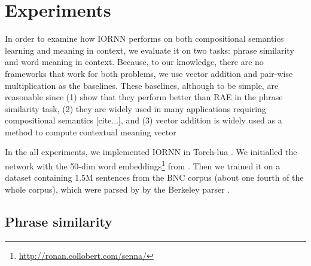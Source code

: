 \documentclass[11pt]{article}
\begin{document}

\section{Experiments}
\label{section experiments}

In order to examine how IORNN performs on both compositional semantics learning and 
meaning in context, we evaluate it on two tasks: phrase similarity and 
word meaning in context. Because, to our knowledge, there are no frameworks 
that work for both problems, we use vector addition and pair-wise multiplication 
as the baselines. These baselines, although to be simple, are reasonable since 
(1) \cite{blacoe_comparison_2012} show that they perform better than RAE in the 
phrase similarity task, (2) they are widely used in many applications requiring 
compositional semantics [cite...], and (3) vector addition is widely used as a method 
to compute contextual meaning vector \cite{thater2011word}

In the all experiments, we implemented IORNN in Torch-lua \cite{collobert_implementing_2012}.
We initialled the network with the 50-dim word embeddings\footnote{\url{http://ronan.collobert.com/senna/}} 
from \cite{collobert_natural_2011}. Then we trained it on a dataset containing 1.5M sentences
from the BNC corpus (about one fourth of the whole corpus), which were parsed by by the Berkeley parser \cite{petrov2006learning}.

\subsection{Phrase similarity}
\label{subsection phrase similarity}






\end{document}
